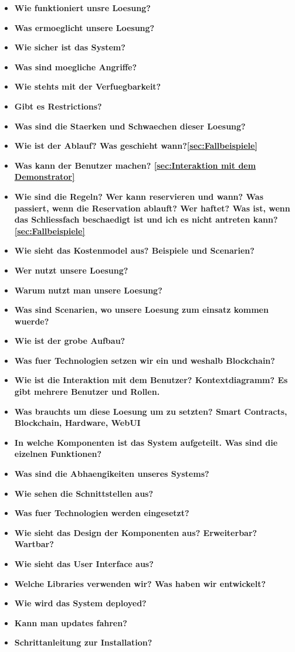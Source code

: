 \begin{itemize}
    \item \textbf{ Wie funktioniert unsre Loesung? }
    \item \textbf{ Was ermoeglicht unsere Loesung? }
    \item \textbf{ Wie sicher ist das System? }
    \item \textbf{ Was sind moegliche Angriffe? }
    \item \textbf{ Wie stehts mit der Verfuegbarkeit?}
    \item \textbf{ Gibt es Restrictions?}
    \item \textbf{ Was sind die Staerken und Schwaechen dieser Loesung? }
    \item \textbf{ Wie ist der Ablauf? Was geschieht wann?\ref{sec:Fallbeispiele}}
    \item \textbf{ Was kann der Benutzer machen? \ref{sec:Interaktion mit dem Demonstrator}}
    \item \textbf{ Wie sind die Regeln? Wer kann reservieren und wann? Was passiert, wenn die Reservation ablauft? Wer haftet? Was ist, wenn das Schliessfach beschaedigt ist und ich es nicht antreten kann?\ref{sec:Fallbeispiele}}
    \item \textbf{ Wie sieht das Kostenmodel aus? Beispiele und Scenarien?}
    \item \textbf{ Wer nutzt unsere Loesung? }
    \item \textbf{ Warum nutzt man unsere Loesung?}
    \item \textbf{ Was sind Scenarien, wo unsere Loesung zum einsatz kommen wuerde?}
    \item \textbf{ Wie ist der grobe Aufbau?}
    \item \textbf{ Was fuer Technologien setzen wir ein und weshalb Blockchain?}
    \item \textbf{ Wie ist die Interaktion mit dem Benutzer? Kontextdiagramm? Es gibt mehrere Benutzer und Rollen.}
    \item \textbf{ Was brauchts um diese Loesung um zu setzten? Smart Contracts, Blockchain, Hardware, WebUI }
    \item \textbf{ In welche Komponenten ist das System aufgeteilt. Was sind die eizelnen Funktionen?}
    \item \textbf{ Was sind die Abhaengikeiten unseres Systems?}
    \item \textbf{ Wie sehen die Schnittstellen aus?} 
    \item \textbf{ Was fuer Technologien werden eingesetzt?} 
    \item \textbf{ Wie sieht das Design der Komponenten aus? Erweiterbar? Wartbar?} 
    \item \textbf{ Wie sieht das User Interface aus?} 
    \item \textbf{ Welche Libraries verwenden wir? Was haben wir entwickelt?}
    \item \textbf{ Wie wird das System deployed?}
    \item \textbf{ Kann man updates fahren?}
    \item \textbf{ Schrittanleitung zur Installation?}
\end{itemize}
    

